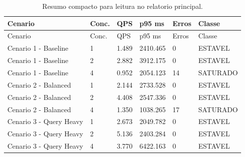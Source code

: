 {
\small
\setlength{\tabcolsep}{4pt}
\renewcommand{\arraystretch}{1.15}
\begin{longtable}{p{}p{}p{}p{}p{}p{}}
\caption{Resumo compacto para leitura no relatorio principal.}\\
\toprule
Cenario & Conc. & QPS & p95 ms & Erros & Classe \\
\midrule
\endfirsthead
\toprule
Cenario & Conc. & QPS & p95 ms & Erros & Classe \\
\midrule
\endhead
Cenario 1 - Baseline & 1 & 1.489 & 2410.465 & 0 & ESTAVEL \\
Cenario 1 - Baseline & 2 & 2.882 & 3912.175 & 0 & ESTAVEL \\
Cenario 1 - Baseline & 4 & 0.952 & 2054.123 & 14 & SATURADO \\
Cenario 2 - Balanced & 1 & 2.144 & 2733.528 & 0 & ESTAVEL \\
Cenario 2 - Balanced & 2 & 4.408 & 2547.336 & 0 & ESTAVEL \\
Cenario 2 - Balanced & 4 & 1.350 & 1038.265 & 17 & SATURADO \\
Cenario 3 - Query Heavy & 1 & 2.673 & 2049.782 & 0 & ESTAVEL \\
Cenario 3 - Query Heavy & 2 & 5.136 & 2403.284 & 0 & ESTAVEL \\
Cenario 3 - Query Heavy & 4 & 3.770 & 6422.163 & 0 & ESTAVEL \\
\bottomrule
\end{longtable}
}

